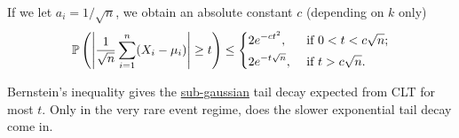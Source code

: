 \begin{note}
  If we let \(a_i = 1 / \sqrt{n} \), we obtain an absolute constant \(c\) (depending on \(k\) only)
  \[
    \mathbb{P} \left( \left\vert \frac{1}{\sqrt{n} } \sum_{i=1}^{n} (X_i - \mu _i) \right\vert \geq t \right) \leq
    \begin{dcases}
      2e^{-ct^{2} },    & \text{ if } 0 < t < c\sqrt{n}  ; \\
      2e^{-t\sqrt{n} }, & \text{ if } t > c\sqrt{n} .
    \end{dcases}
  \]
\end{note}

\begin{remark}
  Bernstein's inequality gives the \hyperref[def:sub-gaussian]{sub-gaussian} tail decay expected from CLT for most \(t\). Only in the very rare event regime, does the slower exponential tail decay come in.
\end{remark}